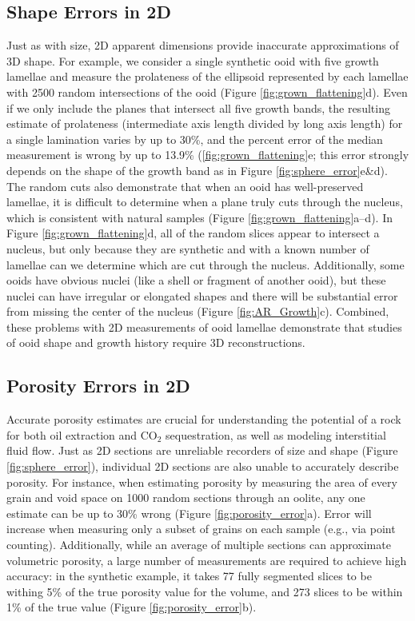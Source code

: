 \documentclass[draft]{agujournal2019}
\begin{document}
\subsection{Shape Errors in 2D}
Just as with size, 2D apparent dimensions provide inaccurate approximations of 3D shape. For example, we consider a single synthetic ooid with five growth lamellae and measure the prolateness of the ellipsoid represented by each lamellae with 2500 random intersections of the ooid (Figure \ref{fig:grown_flattening}d). Even if we only include the planes that intersect all five growth bands, the resulting estimate of prolateness (intermediate axis length divided by long axis length) for a single lamination varies by up to 30\%, and the percent error of the median measurement is wrong by up to 13.9\% (\ref{fig:grown_flattening}e; this error strongly depends on the shape of the growth band as in Figure \ref{fig:sphere_error}e\&d). The random cuts also demonstrate that when an ooid has well-preserved lamellae, it is difficult to determine when a plane truly cuts through the nucleus, which is consistent with natural samples (Figure \ref{fig:grown_flattening}a--d). In Figure \ref{fig:grown_flattening}d, all of the random slices appear to intersect a nucleus, but only because they are synthetic and with a known number of lamellae can we determine which are cut through the nucleus. Additionally, some ooids have obvious nuclei (like a shell or fragment of another ooid), but these nuclei can have irregular or elongated shapes and there will be substantial error from missing the center of the nucleus (Figure \ref{fig:AR_Growth}c). Combined, these problems with 2D measurements of ooid lamellae demonstrate that studies of ooid shape and growth history require 3D reconstructions.   


\subsection{Porosity Errors in 2D}
Accurate porosity estimates are crucial for understanding the potential of a rock for both oil extraction and CO\(_2\) sequestration, as well as modeling interstitial fluid flow. Just as 2D sections are unreliable recorders of size and shape (Figure \ref{fig:sphere_error}), individual 2D sections are also unable to accurately describe porosity. For instance, when estimating porosity by measuring the area of every grain and void space on 1000 random sections through an oolite, any one estimate can be up to 30\% wrong (Figure \ref{fig:porosity_error}a). Error will increase when measuring only a subset of grains on each sample (e.g., via point counting). Additionally, while an average of multiple sections can approximate volumetric porosity, a large number of measurements are required to achieve high accuracy: in the synthetic example, it takes 77 fully segmented slices to be withing 5\% of the true porosity value for the volume, and 273 slices to be within 1\% of the true value (Figure \ref{fig:porosity_error}b).     
\end{document}

